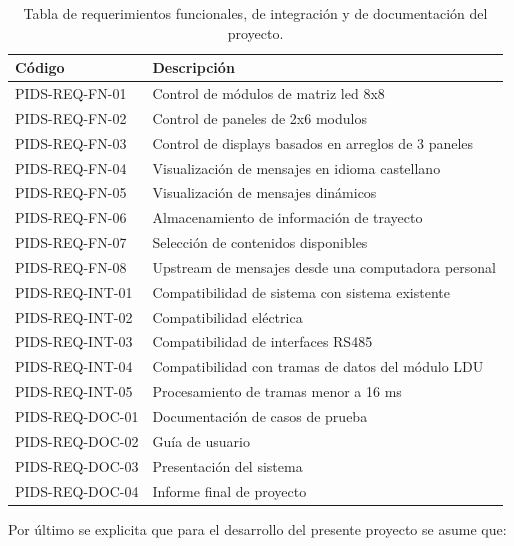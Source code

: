 \begin{table}[htb]
\begin{tabular}{|l|l|}
\hline
\textbf{Código} & \textbf{Descripción}                                 \\ \hline
PIDS-REQ-FN-01  & Control de módulos de matriz led 8x8                 \\ \hline
PIDS-REQ-FN-02  & Control de paneles de 2x6 modulos                    \\ \hline
PIDS-REQ-FN-03  & Control de displays basados en arreglos de 3 paneles \\ \hline
PIDS-REQ-FN-04  & Visualización de mensajes en idioma castellano       \\ \hline
PIDS-REQ-FN-05  & Visualización de mensajes dinámicos                  \\ \hline
PIDS-REQ-FN-06  & Almacenamiento de información de trayecto            \\ \hline
PIDS-REQ-FN-07  & Selección de contenidos disponibles                  \\ \hline
PIDS-REQ-FN-08  & Upstream de mensajes desde una computadora personal  \\ \hline
PIDS-REQ-INT-01 & Compatibilidad de sistema con sistema existente      \\ \hline
PIDS-REQ-INT-02 & Compatibilidad eléctrica                             \\ \hline
PIDS-REQ-INT-03 & Compatibilidad de interfaces RS485                   \\ \hline
PIDS-REQ-INT-04 & Compatibilidad con tramas de datos del módulo LDU    \\ \hline
PIDS-REQ-INT-05 & Procesamiento de tramas menor a 16 ms                \\ \hline
PIDS-REQ-DOC-01 & Documentación de casos de prueba                     \\ \hline
PIDS-REQ-DOC-02 & Guía de usuario                                      \\ \hline
PIDS-REQ-DOC-03 & Presentación del sistema                             \\ \hline
PIDS-REQ-DOC-04 & Informe final de proyecto                            \\ \hline
\end{tabular}
	\caption{Tabla de requerimientos funcionales, de integración y de documentación del proyecto.}
	\label{tab:Reqs}
\end{table}


Por último se explicita que para el desarrollo del presente proyecto se asume que:

